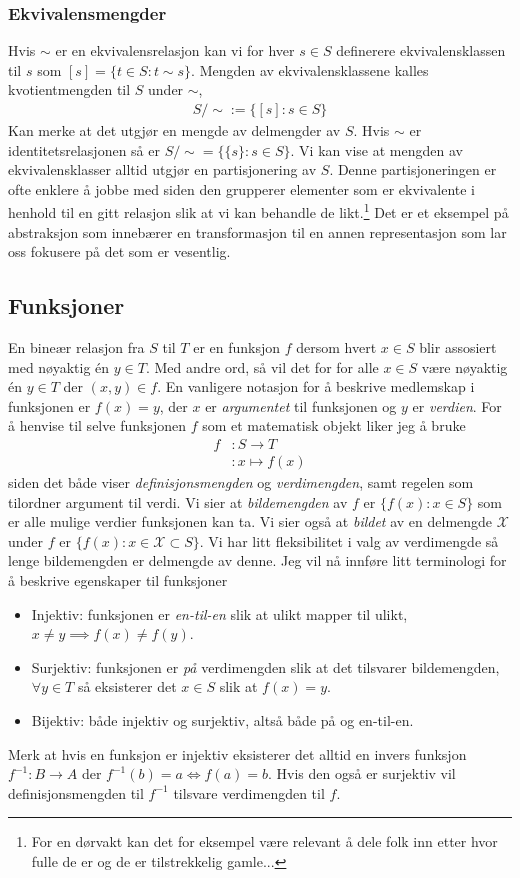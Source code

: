 \subsubsection{Ekvivalensmengder}
Hvis $\sim$ er en ekvivalensrelasjon kan vi for hver $s \in S$ definerere ekvivalensklassen til $s$ som $[s]=\{t\in S: t \sim s\}$. Mengden av ekvivalensklassene kalles kvotientmengden til $S$ under $\sim$, 
\begin{align}
S/\sim := \{[s]:s\in S\}
\end{align}
Kan merke at det utgjør en mengde av delmengder av $S$. Hvis $\sim$ er identitetsrelasjonen så er $S/\sim = \{\{s\}: s \in S\}$. Vi kan vise at mengden av ekvivalensklasser alltid utgjør en partisjonering av $S$. Denne partisjoneringen er ofte enklere å jobbe med siden den grupperer elementer som er ekvivalente i henhold til en gitt relasjon slik at vi kan behandle de likt.\footnote{For en dørvakt kan det for eksempel være relevant å dele folk inn etter hvor fulle de er og de er tilstrekkelig gamle...} Det er et eksempel på abstraksjon som innebærer en transformasjon til en annen representasjon som lar oss fokusere på det som er vesentlig. 
\subsection{Funksjoner}
En bineær relasjon fra $S$ til $T$ er en funksjon $f$ dersom hvert $x\in S$ blir assosiert med nøyaktig én $y\in T$. Med andre ord, så vil det for for alle $x \in S$ være nøyaktig én $y \in T$ der $(x,y) \in f$. En vanligere notasjon for å beskrive medlemskap i funksjonen er $f(x)=y$, der $x$ er \textit{argumentet} til funksjonen og $y$ er \textit{verdien}. For å henvise til selve funksjonen $f$ som et matematisk objekt liker jeg å bruke
\begin{align*}
f&:S\to T \\
&:x \mapsto f(x)
\end{align*}
siden det både viser \textit{definisjonsmengden} og \textit{verdimengden}, samt regelen som tilordner argument til verdi. Vi sier at \textit{bildemengden} av $f$ er $\{f(x):x\in S\}$ som er alle mulige verdier funksjonen kan ta. Vi sier også at \textit{bildet} av en delmengde $\mathcal{X}$ under $f$ er $\{f(x):x\in \mathcal{X}\subset S\}$. Vi har litt fleksibilitet i valg av verdimengde så lenge bildemengden er delmengde av denne. Jeg vil nå innføre litt terminologi for å beskrive egenskaper til funksjoner
\begin{itemize}
\item Injektiv: funksjonen er \textit{en-til-en} slik at ulikt mapper til ulikt, $x \neq y \implies f(x) \neq f(y)$.
\item Surjektiv: funksjonen er \textit{på} verdimengden slik at det tilsvarer bildemengden, $\forall y \in T$ så eksisterer det $x \in S$ slik at $f(x)=y$.
\item Bijektiv: både injektiv og surjektiv, altså både på og en-til-en.
\end{itemize}
Merk at hvis en funksjon er injektiv eksisterer det alltid en invers funksjon $f^{-1}:B\rightarrow A$ der $f^{-1}(b)=a \iff f(a)=b$. Hvis den også er surjektiv vil definisjonsmengden til $f^{-1}$ tilsvare verdimengden til $f$. 
